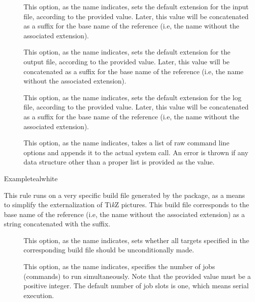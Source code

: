\begin{description}
\begin{description}
\item[] This option, as the name indicates, sets the default extension for the input file, according to the provided value. Later, this value will be concatenated as a suffix for the base name of the  reference (i.e, the name without the associated extension).

\item[] This option, as the name indicates, sets the default extension for the output file, according to the provided value. Later, this value will be concatenated as a suffix for the base name of the  reference (i.e, the name without the associated extension).

\item[] This option, as the name indicates, sets the default extension for the log file, according to the provided value. Later, this value will be concatenated as a suffix for the base name of the  reference (i.e, the name without the associated extension).

\item[] This option, as the name indicates, takes a list of raw command line options and appends it to the actual system call. An error is thrown if any data structure other than a proper list is provided as the value.
\end{description}

\begin{codebox}{Example}{teal}{\icnote}{white}
\end{codebox}

\item[\rulebox{tikzmake}]
This rule runs  on a very specific build file generated by the  package, as a means to simplify the externalization of Ti{\itshape k}Z pictures. This build file corresponds to the base name of the  reference (i.e, the name without the associated extension) as a string concatenated with the  suffix.

\begin{description}
\item[] This option, as the name indicates, sets whether all targets specified in the corresponding build file should be unconditionally made.

\item[] This option, as the name indicates, specifies the number of jobs (commands) to run simultaneously. Note that the provided value must be a positive integer. The default number of job slots is one, which means serial execution.


\end{description}
\end{description}

